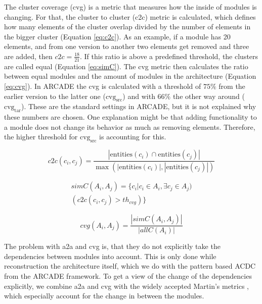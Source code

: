 \documentclass[sigplan, anonymous, review]{acmart}
\begin{document}
The cluster coverage (cvg) is a metric that measures how the inside of modules is changing. For that, the cluster to cluster (c2c) metric is calculated, which defines how many elements of the cluster overlap divided by the number of elements in the bigger cluster (Equation \ref{eq:c2c}). 
As an example, if a module has 20 elements, and from one version to another two elements get removed and three are added, then $c2c = \frac{18}{21}$. 
If this ratio is above a predefined threshold, the clusters are called equal (Equation \ref{eq:simC}). The cvg metric then calculates the ratio between equal modules and the amount of modules in the architecture (Equation \ref{eq:cvg}). In ARCADE the cvg is calculated with a threshold of $75\%$ from the earlier version to the latter one ($\text{cvg}_\text{src}$) and with $66\%$ the other way around ($\text{cvg}_\text{tar}$). These are the standard settings in ARCADE, but it is not explained why these numbers are chosen. One explanation might be that adding functionality to a module does not change its behavior as much as removing elements. Therefore, the higher threshold for $\text{cvg}_\text{src}$ is accounting for this.

\begin{equation} \label{eq:c2c}
c2c(c_i, c_j) = \frac{|\text{entities}(c_i) \cap \text{entities}(c_j)|}{\max(|\text{entities}(c_i)|, |\text{entities}(c_j)|)}
\end{equation}

\begin{equation} \label{eq:simC}
\begin{split}
simC(A_i, A_j) = \{c_i | c_i \in A_i, \exists c_j \in A_j) \\ 
(c2c(c_i, c_j) > th_{cvg})\}
\end{split}
\end{equation}

\begin{equation} \label{eq:cvg}
cvg(A_i, A_j) = \frac{|simC(A_i, A_j)|}{|allC(A_i)|}
\end{equation}

The problem with a2a and cvg is, that they do not explicitly take the dependencies between modules into account. This is only done while reconstruction the architecture itself, which we do with the pattern based ACDC from the ARCADE framework. 
To get a view of the change of the dependencies explicitly, we combine a2a and cvg with the widely accepted Martin's metrics \cite{Val-MartinsMet}, which especially account for the change in between the modules. 
\end{document}
